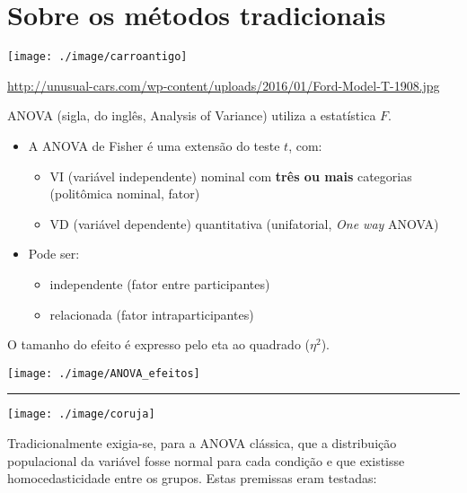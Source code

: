 \documentclass[]{article}
\providecommand{\tightlist}{%
  \setlength{\itemsep}{0pt}\setlength{\parskip}{0pt}}
\begin{document}
\section{Sobre os métodos
tradicionais}\label{sobre-os-metodos-tradicionais}

\begin{center}\texttt{[image: ./image/carroantigo]} \end{center}

\url{http://unusual-cars.com/wp-content/uploads/2016/01/Ford-Model-T-1908.jpg}

ANOVA (sigla, do inglês, Analysis of Variance) utiliza a estatística
\(F\).

\begin{itemize}
\tightlist
\item
  A ANOVA de Fisher é uma extensão do teste \(t\), com:

  \begin{itemize}
  \tightlist
  \item
    VI (variável independente) nominal com \textbf{três ou mais}
    categorias (politômica nominal, fator)
  \item
    VD (variável dependente) quantitativa (unifatorial, \emph{One way}
    ANOVA)
  \end{itemize}
\item
  Pode ser:

  \begin{itemize}
  \tightlist
  \item
    independente (fator entre participantes)
  \item
    relacionada (fator intraparticipantes)
  \end{itemize}
\end{itemize}

O tamanho do efeito é expresso pelo eta ao quadrado (\(\eta^2\)).

\begin{center}\texttt{[image: ./image/ANOVA\_efeitos]} \end{center}

\begin{center}\rule{0.5\linewidth}{\linethickness}\end{center}

\begin{flushleft}\texttt{[image: ./image/coruja]} \end{flushleft}

Tradicionalmente exigia-se, para a ANOVA clássica, que a distribuição
populacional da variável fosse normal para cada condição e que existisse
homocedasticidade entre os grupos. Estas premissas eram testadas:
\end{document}
